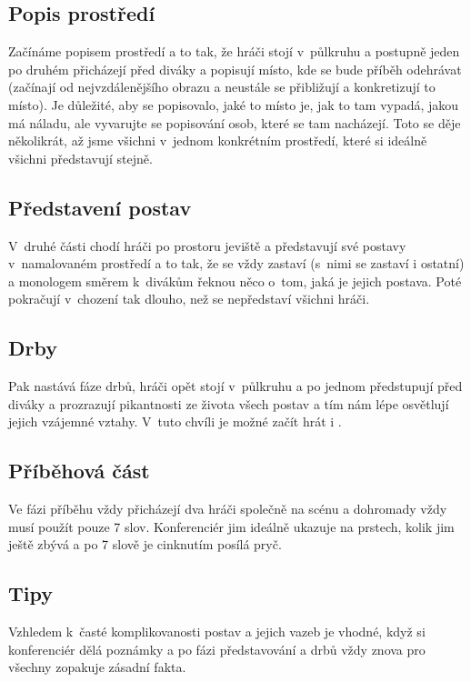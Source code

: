 \subsection{ Popis prostředí } Začínáme popisem prostředí a to tak, že hráči stojí v~půlkruhu a postupně jeden po druhém přicházejí před diváky a popisují místo, kde se bude příběh odehrávat (začínají od nejvzdálenějšího obrazu a neustále se přibližují a konkretizují to místo). Je důležité, aby se popisovalo, jaké to místo je, jak to tam vypadá, jakou má náladu, ale vyvarujte se popisování osob, které se tam nacházejí. Toto se děje několikrát, až jsme všichni v~jednom konkrétním prostředí, které si ideálně všichni představují stejně. 
 
\subsection{ Představení postav } V~druhé části chodí hráči po prostoru jeviště a představují své postavy v~namalovaném prostředí a to tak, že se vždy zastaví (s~nimi se zastaví i ostatní) a monologem směrem k~divákům řeknou něco o~tom, jaká je jejich postava. Poté pokračují v~chození tak dlouho, než se nepředstaví všichni hráči. 
 
\subsection{ Drby } Pak nastává fáze drbů, hráči opět stojí v~půlkruhu a po jednom předstupují před diváky a prozrazují pikantnosti ze života všech postav a tím nám lépe osvětlují jejich vzájemné vztahy. V~tuto chvíli je možné začít hrát i . 
 
\subsection{ Příběhová část } Ve fázi příběhu vždy přicházejí dva hráči společně na scénu a dohromady vždy musí použít pouze 7 slov. Konferenciér jim ideálně ukazuje na prstech, kolik jim ještě zbývá a po 7 slově je cinknutím posílá pryč. 
 
\subsection{ Tipy } Vzhledem k~časté komplikovanosti postav a jejich vazeb je vhodné, když si konferenciér dělá poznámky a po fázi představování a drbů vždy znova pro všechny zopakuje zásadní fakta. 
 
 
 
